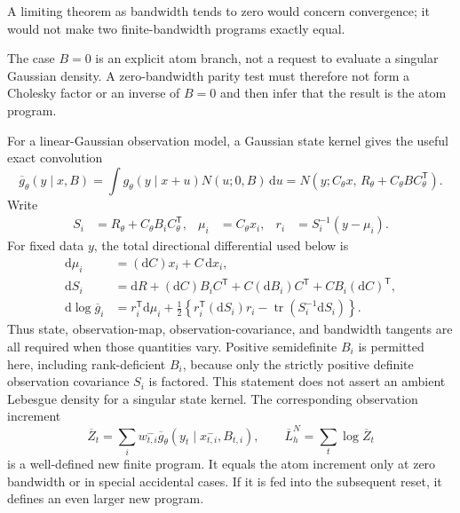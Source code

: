 \documentclass[11pt]{article}
\newcommand{\dd}{\mathrm{d}}
\begin{document}
A limiting theorem as bandwidth tends to zero would concern convergence;
it would not make two finite-bandwidth programs exactly equal.

The case $B=0$ is an explicit atom branch, not a request to evaluate a
singular Gaussian density.  A zero-bandwidth parity test must therefore not
form a Cholesky factor or an inverse of $B=0$ and then infer that the result is
the atom program.

For a linear-Gaussian observation model, a Gaussian state kernel gives the
useful exact convolution
\begin{equation}
 \overline g_\theta(y\mid x,B)
 = \int g_\theta(y\mid x+u)N(u;0,B)\,\dd u
 = N\!\left(y;C_\theta x,\,
       R_\theta+C_\theta B C_\theta^\mathsf{T}\right).
 \label{eq:linear-convolution}
\end{equation}
Write
\begin{align}
 S_i &= R_\theta+C_\theta B_i C_\theta^\mathsf{T}, &
 \mu_i &= C_\theta x_i, &
 r_i &= S_i^{-1}(y-\mu_i).
\end{align}
For fixed data $y$, the total directional differential used below is
\begin{align}
 \dd\mu_i
   &= (\dd C)x_i+C\,\dd x_i,\\
 \dd S_i
   &= \dd R+(\dd C)B_iC^\mathsf{T}
      +C(\dd B_i)C^\mathsf{T}+CB_i(\dd C)^\mathsf{T},\\
 \dd\log \overline g_i
   &=r_i^\mathsf{T}\dd\mu_i
     +\frac12\left\{
       r_i^\mathsf{T}(\dd S_i)r_i
       -\operatorname{tr}(S_i^{-1}\dd S_i)
     \right\}.
 \label{eq:linear-convolution-tangent}
\end{align}
Thus state, observation-map, observation-covariance, and bandwidth tangents
are all required when those quantities vary.  Positive semidefinite $B_i$ is
permitted here, including rank-deficient $B_i$, because only the strictly
positive definite observation covariance $S_i$ is factored.  This statement
does not assert an ambient Lebesgue density for a singular state kernel.
The corresponding observation increment
\begin{equation}
 \overline Z_t
 =\sum_i w_{t,i}^{-}\overline g_\theta(y_t\mid x_{t,i}^{-},B_{t,i}),
 \qquad
 \overline L_h^N=\sum_t\log\overline Z_t
 \label{eq:smoothed-value}
\end{equation}
is a well-defined new finite program.  It equals the atom increment only at
zero bandwidth or in special accidental cases.  If it is fed into the
subsequent reset, it defines an even larger new program.
\end{document}

